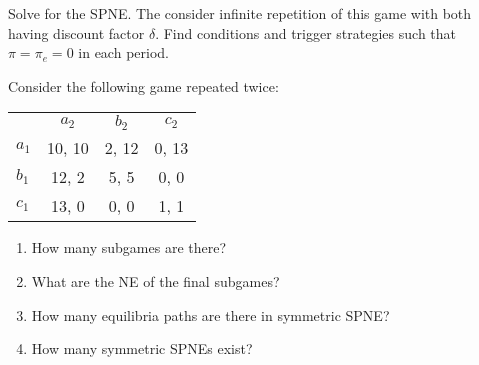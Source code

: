 \documentclass[10pt]{article}
\begin{document}
\begin{spacing}{1.0}
\begin{exercise}
 \vspace{1em}
 Solve for the SPNE. The consider infinite repetition of this game with both having
 discount factor $\delta$. Find conditions and trigger strategies such that $\pi =
 \pi_e = 0$ in each period.
\end{exercise}

\begin{exercise}
  Consider the following game repeated twice: 
  \begin{center}
    \begin{tabular}{rccc}
                                 & $a_2$ & $b_2$ & $c_2$  \\ \cline{2-4}
      \multicolumn{1}{l|}{$a_1$} & 10, 10 & 2, 12  & 0, 13 \\
      \multicolumn{1}{l|}{$b_1$} & 12, 2  & 5, 5   & 0, 0  \\
      \multicolumn{1}{l|}{$c_1$} & 13, 0  & 0, 0   & 1, 1  \\
    \end{tabular}
  \end{center}
  \begin{enumerate}
  \item How many subgames are there?
  \item What are the NE of the final subgames?
  \item How many equilibria paths are there in symmetric SPNE?
  \item How many symmetric SPNEs exist?
  \end{enumerate}
\end{exercise}


\end{spacing}
\end{document}
